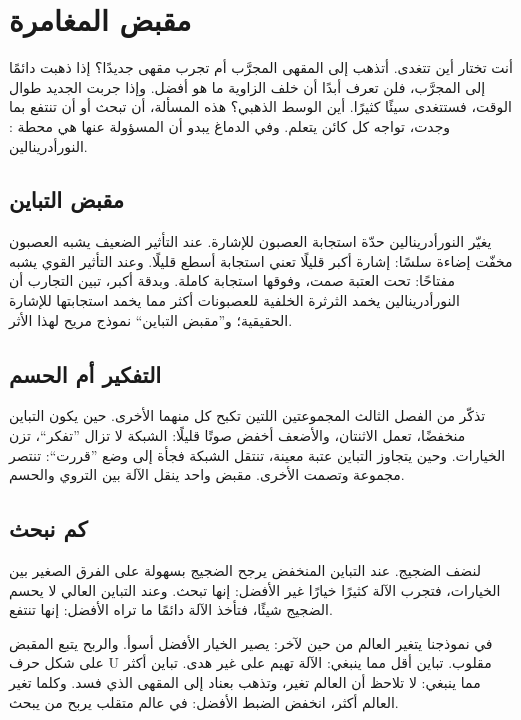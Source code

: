 \chapter{مقبض المغامرة}

أنت تختار أين تتغدى. أتذهب إلى المقهى المجرَّب أم تجرب مقهى جديدًا؟ إذا ذهبت دائمًا إلى المجرَّب، فلن تعرف أبدًا أن خلف الزاوية ما هو أفضل. وإذا جربت الجديد طوال الوقت، فستتغدى سيئًا كثيرًا. أين الوسط الذهبي؟ هذه المسألة، أن تبحث أو أن تنتفع بما وجدت، تواجه كل كائن يتعلم. وفي الدماغ يبدو أن المسؤولة عنها هي محطة : النورأدرينالين.

\section*{مقبض التباين}

يغيّر النورأدرينالين حدّة استجابة العصبون للإشارة. عند التأثير الضعيف يشبه العصبون مخفّت إضاءة سلسًا: إشارة أكبر قليلًا تعني استجابة أسطع قليلًا. وعند التأثير القوي يشبه مفتاحًا: تحت العتبة صمت، وفوقها استجابة كاملة. وبدقة أكبر، تبين التجارب أن النورأدرينالين يخمد الثرثرة الخلفية للعصبونات أكثر مما يخمد استجابتها للإشارة الحقيقية؛ و”مقبض التباين“ نموذج مريح لهذا الأثر.


\section*{التفكير أم الحسم}

تذكّر من الفصل الثالث المجموعتين اللتين تكبح كل منهما الأخرى. حين يكون التباين منخفضًا، تعمل الاثنتان، والأضعف أخفض صوتًا قليلًا: الشبكة لا تزال ”تفكر“، تزن الخيارات. وحين يتجاوز التباين عتبة معينة، تنتقل الشبكة فجأة إلى وضع ”قررت“: تنتصر مجموعة وتصمت الأخرى. مقبض واحد ينقل الآلة بين التروي والحسم.

\section*{كم نبحث}

لنضف الضجيج. عند التباين المنخفض يرجح الضجيج بسهولة على الفرق الصغير بين الخيارات، فتجرب الآلة كثيرًا خيارًا غير الأفضل: إنها تبحث. وعند التباين العالي لا يحسم الضجيج شيئًا، فتأخذ الآلة دائمًا ما تراه الأفضل: إنها تنتفع.

في نموذجنا يتغير العالم من حين لآخر: يصير الخيار الأفضل أسوأ. والربح يتبع المقبض على شكل حرف U مقلوب. تباين أقل مما ينبغي: الآلة تهيم على غير هدى. تباين أكثر مما ينبغي: لا تلاحظ أن العالم تغير، وتذهب بعناد إلى المقهى الذي فسد. وكلما تغير العالم أكثر، انخفض الضبط الأفضل: في عالم متقلب يربح من يبحث.

